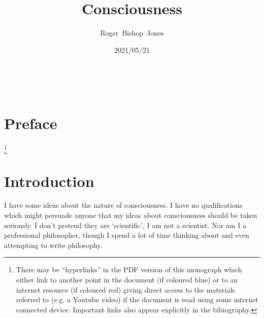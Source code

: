 \documentclass[10pt,titlepage]{article}
\title{\LARGE\bf Consciousness}
\author{Roger~Bishop~Jones}
\date{\small 2021/05/21}
\newcommand{\ignore}[1]{}
\begin{document}
                               
\begin{titlepage}
\maketitle





\end{titlepage}

\ \

\ignore{
\begin{centering}
{}
\end{centering}
}%

\setcounter{tocdepth}{2}
{\parskip-0pt\tableofcontents}


\pagebreak

\section*{Preface}


\footnote{There may be ``hyperlinks'' in the PDF version of this monograph which either link to another point in the document  (if coloured blue) or to an internet resource  (if coloured red) giving direct access to the materials referred to (e.g. a Youtube video) if the document is read using some internet connected device.
Important links also appear explicitly in the bibiography.}

\section{Introduction}

I have some ideas about the nature of consciousness.
I have no qualifications which might persuade anyone that my ideas about consciousness should be taken seriously.
I don't pretend they are `scientific', I am not a scientist.
Nor am I a professional philosopher, though I spend a lot of time thinking about and even attempting to write philosophy.
\end{document}
